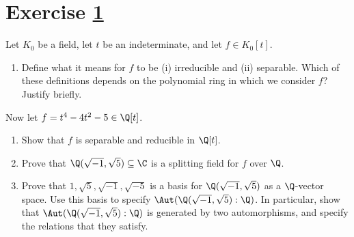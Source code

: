 \section{Exercise \ref{sec : e03q6}}
\label{sec : e03q6}

\noindent{}Let $K_{0}$ be a field, let $t$ be an indeterminate, and let $f \in K_{0}[t]$.
\begin{enumerate}[label=(\alph*)]
\item\label{itm : e03q6a} Define what it means for $f$ to be (i) irreducible and (ii) separable. Which of these definitions depends on the polynomial ring in which we consider $f$? Justify briefly.
\end{enumerate}
Now let $f = t^{4} - 4 t^{2} - 5 \in \Q[t]$.
\begin{enumerate}[resume, label=(\alph*)]
\item\label{itm : e03q6b} Show that $f$ is separable and reducible in $\Q[t]$.
\item\label{itm : e03q6c} Prove that $\Q(\sqrt{-1}, \sqrt{5}) \subseteq \C$ is a splitting field for $f$ over $\Q$.
\item\label{itm : e03q6d} Prove that $1, \sqrt{5}, \sqrt{-1}, \sqrt{-5}$ is a basis for $\Q(\sqrt{-1}, \sqrt{5})$ as a $\Q$-vector space. Use this basis to specify $\Aut(\Q(\sqrt{-1}, \sqrt{5}) : \Q)$. In particular, show that $\Aut(\Q(\sqrt{-1}, \sqrt{5}) : \Q)$ is generated by two automorphisms, and specify the relations that they satisfy.
\end{enumerate}

